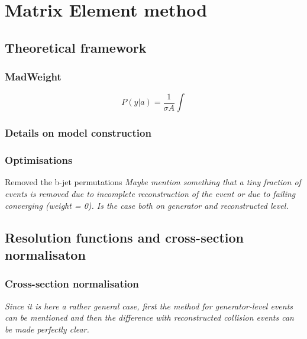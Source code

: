 \chapter{Matrix Element method} \label{ch::MW}

\section{Theoretical framework} \label{sec::MWTheory}
\subsection{MadWeight}

\begin{equation} \label{eq::MWEvtProb}
 P(y \vert a) = \frac{1}{\sigma A} \int
\end{equation}


\subsection{Details on model construction}

\subsection{Optimisations}

Removed the b-jet permutations
\textit{Maybe mention something that a tiny fraction of events is removed due to incomplete reconstruction of the event or due to failing converging (weight = 0). Is the case both on generator and reconstructed level.}

\section{Resolution functions and cross-section normalisaton} \label{sec::TF}

\subsection{Cross-section  normalisation}
\textit{Since it is here a rather general case, first the method for generator-level events can be mentioned and then the difference with reconstructed collision events can be made perfectly clear.}

